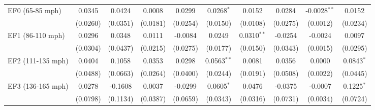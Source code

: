 \documentclass[letterpaper]{article}
\begin{document}
\begin{table}[H]
{\begin{tabular}{lccccccccc}
    EF0 (65-85 mph)       & 0.0345                            & 0.0424                           & 0.0008                             & 0.0299                             & 0.0268$^{*}$                 & 0.0152                           & 0.0284                      & -0.0028$^{**}$             & 0.0152\\   
                        & (0.0260)                          & (0.0351)                         & (0.0181)                           & (0.0254)                           & (0.0150)                     & (0.0108)                         & (0.0275)                    & (0.0012)                   & (0.0234)\\   
   EF1 (86-110 mph)      & 0.0296                            & 0.0348                           & 0.0111                             & -0.0084                            & 0.0249                       & 0.0310$^{**}$                    & -0.0254                     & -0.0024                    & 0.0097\\   
                        & (0.0304)                          & (0.0437)                         & (0.0215)                           & (0.0275)                           & (0.0177)                     & (0.0150)                         & (0.0343)                    & (0.0015)                   & (0.0295)\\   
   EF2 (111-135 mph)      & 0.0404                            & 0.1058                           & 0.0353                             & 0.0298                             & 0.0563$^{**}$                & 0.0081                           & 0.0356                      & 0.0000       & 0.0843$^{*}$\\   
                        & (0.0488)                          & (0.0663)                         & (0.0264)                           & (0.0400)                           & (0.0244)                     & (0.0191)                         & (0.0508)                    & (0.0022)                   & (0.0445)\\   
   EF3 (136-165 mph)      & 0.0278                            & -0.1608                          & 0.0037                             & -0.0299                            & 0.0605$^{*}$                 & 0.0476                           & -0.0375                     & -0.0007                    & 0.1225$^{*}$\\   
                        & (0.0798)                          & (0.1134)                         & (0.0387)                           & (0.0659)                           & (0.0343)                     & (0.0316)                         & (0.0731)                    & (0.0034)                   & (0.0724)\\   

\end{tabular}}
\end{table}
\end{document}
